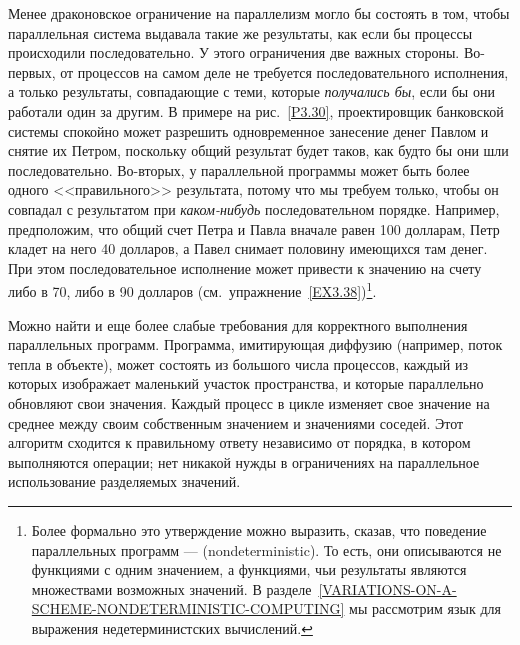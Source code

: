 \begin{cntrfig}

\caption{Одновременные операции при работе с совместным счетом в Банке~1 и личным счетом в Банке~2.}
\label{P3.30}

\end{cntrfig}

Менее драконовское ограничение на параллелизм могло бы
состоять в том, чтобы параллельная система выдавала такие же
результаты, как если бы процессы происходили последовательно.  У этого
ограничения две важных стороны.  Во-первых, от процессов на самом деле
не требуется последовательного исполнения, а только результаты,
совпадающие с теми, которые {\em получались бы}, если бы они работали
один за другим.  В примере на рис.~\ref{P3.30},
проектировщик банковской системы спокойно может разрешить
одновременное занесение денег
Павлом и снятие их Петром, поскольку общий
результат будет таков, как будто бы они шли последовательно. Во-вторых,
у параллельной программы может быть более одного <<правильного>>
результата, потому что мы требуем только, чтобы он совпадал с
результатом при {\em каком-нибудь} последовательном порядке.
Например, предположим, что общий счет Петра и Павла вначале равен 100 долларам,
Петр кладет на него 40 долларов, а Павел снимает половину имеющихся
там денег. При этом последовательное исполнение может привести к
значению на счету либо в 70, либо в 90 долларов
(см.~упражнение~\ref{EX3.38})\footnote{\label{F3.39}Более формально
  это утверждение можно выразить,
  сказав, что поведение параллельных программ ---
   (nondeterministic). То есть, они
  описываются не функциями с одним значением, а функциями, чьи
  результаты являются множествами возможных значений.  В
  разделе~\ref{VARIATIONS-ON-A-SCHEME-NONDETERMINISTIC-COMPUTING}
  мы рассмотрим язык для выражения недетерминистских вычислений.}.

Можно найти и еще более слабые требования для корректного
выполнения параллельных программ.  Программа,
имитирующая диффузию
(например, поток тепла в объекте), может состоять из большого числа
процессов, каждый из которых изображает маленький участок
пространства, и которые параллельно обновляют свои значения.  Каждый
процесс в цикле изменяет свое значение на среднее между своим
собственным значением и значениями соседей.  Этот алгоритм сходится к
правильному ответу независимо от порядка, в котором выполняются
операции; нет никакой нужды в ограничениях на параллельное
использование разделяемых значений.


